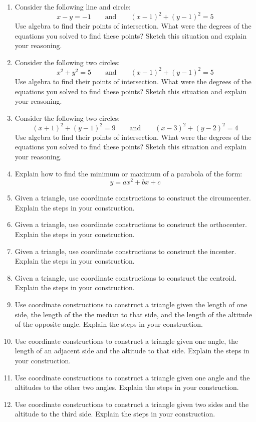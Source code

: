 \begin{problems}
\begin{enumerate}
\item Consider the following line and circle:
\[
x - y = -1\qquad\text{and}\qquad (x-1)^2 + (y-1)^2 = 5 
\]
Use algebra to find their points of intersection. What were the
degrees of the equations you solved to find these points? Sketch this
situation and explain your reasoning.

\item Consider the following two circles:
\[
x^2 + y^2 = 5\qquad \text{and}\qquad (x-1)^2 + (y-1)^2 = 5
\]
Use algebra to find their points of intersection. What were the
degrees of the equations you solved to find these points? Sketch this situation and explain your
reasoning.

\item Consider the following two circles:
\[
(x+1)^2 + (y-1)^2 = 9\qquad \text{and}\qquad (x-3)^2 + (y-2)^2 = 4
\]
Use algebra to find their points of intersection. What were the
degrees of the equations you solved to find these points? Sketch this
situation and explain your reasoning.

\item Explain how to find the minimum or maximum of a parabola of the form:
\[
y = ax^2 + bx + c
\]
\item Given a triangle, use coordinate constructions to construct the
  circumcenter. Explain the steps in your
  construction.
\item Given a triangle, use coordinate constructions to construct the
  orthocenter. Explain the steps in your
  construction.
\item Given a triangle, use coordinate constructions to construct the
  incenter. Explain the steps in your construction.
\item Given a triangle, use coordinate constructions to construct the
  centroid. Explain the steps in your construction.
\item Use coordinate constructions to construct a triangle given the
  length of one side, the length of the the median to that side, and
  the length of the altitude of the opposite angle. Explain the steps
  in your construction.
\item Use coordinate constructions to construct a triangle given one
  angle, the length of an adjacent side and the altitude to that
  side. Explain the steps in your construction.
\item Use coordinate constructions to construct a triangle given one
  angle and the altitudes to the other two angles. Explain the steps
  in your construction.
\item Use coordinate constructions to construct a triangle given two
  sides and the altitude to the third side. Explain the steps in your
  construction.
\end{enumerate}
\end{problems}

